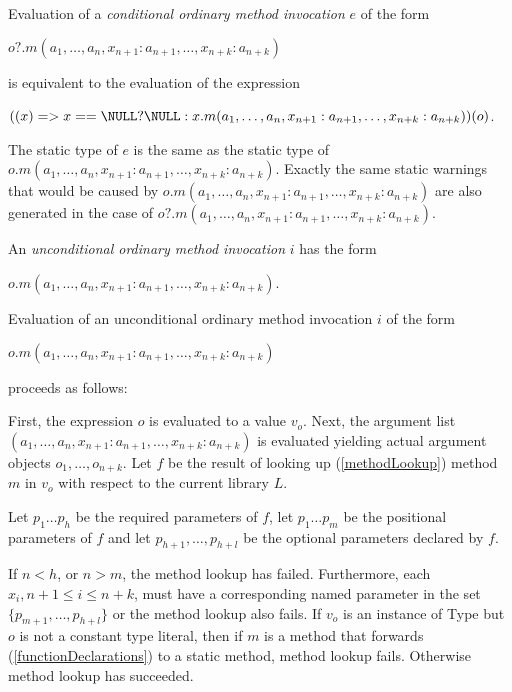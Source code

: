 \documentclass{article}
\newcommand{\code}[1]{{\sf #1}}
\begin{document}
\LMHash{}
Evaluation of a {\em conditional ordinary method invocation} $e$ of the form 

\LMHash{}
$o?.m(a_1, \ldots , a_n, x_{n+1}: a_{n+1}, \ldots , x_{n+k}: a_{n+k})$  

\LMHash{}
is equivalent to the evaluation of the expression  

\LMHash{}
$((x) => x == \NULL ? \NULL : x.m(a_1, \ldots , a_n, x_{n+1}: a_{n+1}, \ldots , x_{n+k}: a_{n+k}))(o)$. 

\LMHash{}
The static type of $e$ is the same as the static type of $o.m(a_1, \ldots , a_n, x_{n+1}: a_{n+1}, \ldots , x_{n+k}: a_{n+k})$. Exactly the same static warnings that would be caused by $o.m(a_1, \ldots , a_n, x_{n+1}: a_{n+1}, \ldots , x_{n+k}: a_{n+k})$ are also generated in the case of $o?.m(a_1, \ldots , a_n, x_{n+1}: a_{n+1}, \ldots , x_{n+k}: a_{n+k})$.

\LMHash{}
An {\em unconditional ordinary method invocation} $i$ has the form 

$o.m(a_1, \ldots , a_n, x_{n+1}: a_{n+1}, \ldots , x_{n+k}: a_{n+k})$.

\LMHash{}
Evaluation of an unconditional ordinary method invocation $i$ of the form 

$o.m(a_1, \ldots , a_n, x_{n+1}: a_{n+1}, \ldots , x_{n+k}: a_{n+k})$ 

proceeds as follows:

\LMHash{}
First, the expression $o$ is evaluated to a value $v_o$. Next, the argument list $(a_1, \ldots , a_n, x_{n+1}: a_{n+1}, \ldots , x_{n+k}: a_{n+k})$ is evaluated yielding actual argument objects $o_1, \ldots , o_{n+k}$. Let $f$ be the result of looking up (\ref{methodLookup}) method $m$  in $v_o$ with respect to the current library $L$. 

\LMHash{}
Let $p_1 \ldots p_h$ be the required parameters of $f$,  let $p_1 \ldots p_m$ be the positional parameters of $f$ and let $p_{h+1}, \ldots, p_{h+l}$ be the optional parameters declared by $f$.


\LMHash{}
If  $n < h$, or $n > m$, the method lookup has failed. Furthermore, each $x_i, n+1 \le i \le n+k$,  must have a corresponding named parameter in the set $\{p_{m+1}, \ldots, p_{h+l}\}$ or the method lookup also fails.  If $v_o$ is an instance of \code{Type} but $o$ is not a constant type literal, then if $m$ is a method that forwards (\ref{functionDeclarations}) to a static method, method lookup fails. Otherwise method lookup has succeeded.
\end{document}
